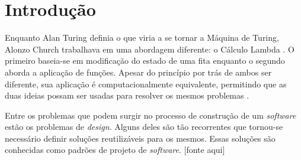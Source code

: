 
\chapter{Introdução}
%

Enquanto Alan Turing definia o que viria a 
se tornar a Máquina de Turing, Alonzo Church 
trabalhava em uma abordagem diferente: o Cálculo Lambda
\cite{church1932set,church1936unsolvable,sep-turing-machine}. 
O primeiro baseia-se em modificação do estado de 
uma fita enquanto o segundo aborda a aplicação 
de funções. Apesar do princípio por trás de ambos 
ser diferente, sua aplicação é computacionalmente 
equivalente, permitindo que as duas ideias possam 
ser usadas para resolver os mesmos problemas
\cite{sep-church-turing}.


Entre os problemas que podem surgir no 
processo de construção de um \textit{software} 
estão os problemas de \textit{design}. Alguns 
deles são tão recorrentes que tornou-se 
necessário definir soluções reutilizáveis 
para os mesmos. Essas soluções são conhecidas 
como padrões de projeto de \textit{software}. 
[fonte aqui]

